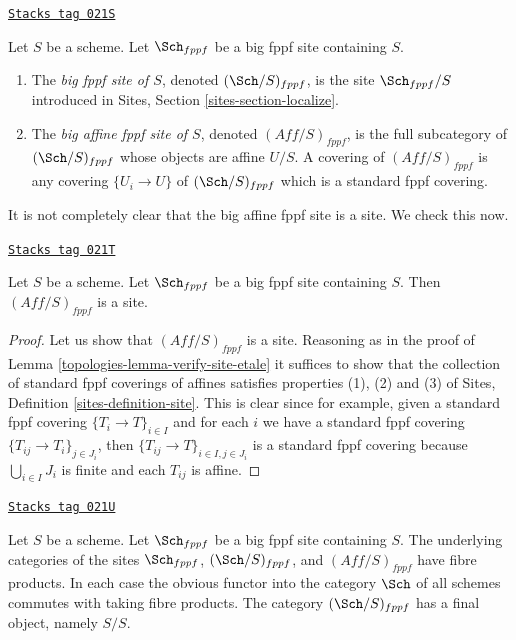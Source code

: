 \begin{definition}
\label{topologies-definition-big-small-fppf}
\href{https://stacks.math.columbia.edu/tag/021S}{\texttt{Stacks tag 021S}}

Let $S$ be a scheme. Let $\Sch_{fppf}$ be a big fppf
site containing $S$.
\begin{enumerate}
\item The {\it big fppf site of $S$}, denoted
$(\Sch/S)_{fppf}$, is the site $\Sch_{fppf}/S$
introduced in Sites, Section \ref{sites-section-localize}.
\item The {\it big affine fppf site of $S$}, denoted
$(\textit{Aff}/S)_{fppf}$, is the full subcategory of
$(\Sch/S)_{fppf}$ whose objects are affine $U/S$.
A covering of $(\textit{Aff}/S)_{fppf}$ is any covering
$\{U_i \to U\}$ of $(\Sch/S)_{fppf}$ which is a
standard fppf covering.
\end{enumerate}
\end{definition}

It is not completely clear that
the big affine fppf site is a site. We check this now.

\begin{lemma}
\label{topologies-lemma-verify-site-fppf}
\href{https://stacks.math.columbia.edu/tag/021T}{\texttt{Stacks tag 021T}}

Let $S$ be a scheme. Let $\Sch_{fppf}$ be a big fppf
site containing $S$. Then $(\textit{Aff}/S)_{fppf}$ is a site.
\end{lemma}

\begin{proof}

Let us show that $(\textit{Aff}/S)_{fppf}$ is a site.
Reasoning as in the proof of Lemma \ref{topologies-lemma-verify-site-etale}
it suffices to show that the collection
of standard fppf coverings of affines satisfies properties
(1), (2) and (3) of
Sites, Definition \ref{sites-definition-site}.
This is clear since for example, given a standard fppf
covering $\{T_i \to T\}_{i\in I}$ and for each
$i$ we have a standard fppf covering $\{T_{ij} \to T_i\}_{j\in J_i}$, then
$\{T_{ij} \to T\}_{i \in I, j\in J_i}$ is a standard fppf covering
because $\bigcup_{i\in I} J_i$ is finite and each $T_{ij}$ is affine.
\end{proof}

\begin{lemma}
\label{topologies-lemma-fibre-products-fppf}
\href{https://stacks.math.columbia.edu/tag/021U}{\texttt{Stacks tag 021U}}

Let $S$ be a scheme. Let $\Sch_{fppf}$ be a big fppf
site containing $S$. The underlying categories of the sites
$\Sch_{fppf}$, $(\Sch/S)_{fppf}$,
and $(\textit{Aff}/S)_{fppf}$ have fibre products.
In each case the obvious functor into the category $\Sch$ of
all schemes commutes with taking fibre products. The category
$(\Sch/S)_{fppf}$ has a final object, namely $S/S$.
\end{lemma}

